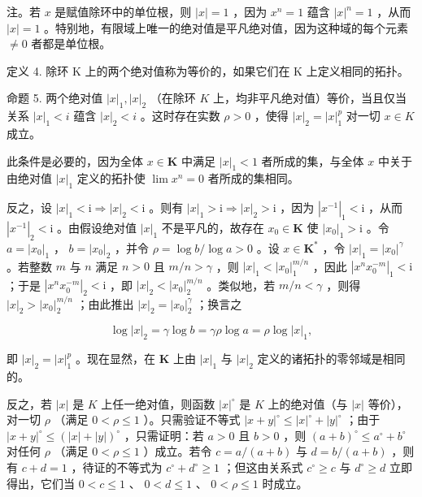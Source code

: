 注。若 \(x\) 是赋值除环中的单位根，则 \(|x| = 1\) ，因为 \(x^n = 1\) 蕴含 \(|x|^n = 1\) ，从而 \(|x| = 1\) 。特别地，有限域上唯一的绝对值是平凡绝对值，因为这种域的每个元素 \(\neq 0\) 者都是单位根。

定义 4. 除环 K 上的两个绝对值称为等价的，如果它们在 K 上定义相同的拓扑。

命题 5. 两个绝对值 \(|x|_1, |x|_2\) （在除环 \(K\) 上，均非平凡绝对值）等价，当且仅当关系 \(|x|_1 < i\) 蕴含 \(|x|_2 < i\) 。这时存在实数 \(\rho > 0\) ，使得 \(|x|_2 = |x|_1^p\) 对一切 \(x \in K\) 成立。

此条件是必要的，因为全体 \(x \in \mathbf{K}\) 中满足 \(|x|_1 < 1\) 者所成的集，与全体 \(x\) 中关于由绝对值 \(|x|_1\) 定义的拓扑使 \(\lim x^n = 0\) 者所成的集相同。

反之，设 \(|x|_1 < \mathrm{i} \Longrightarrow |x|_2 < \mathrm{i}\) 。则有 \(|x|_1 > \mathrm{i} \Longrightarrow |x|_2 > \mathrm{i}\) ，因为 \(|x^{-1}|_1 < \mathrm{i}\) ，从而 \(|x^{-1}|_2 < \mathrm{i}\) 。由假设绝对值 \(|x|_1\) 不是平凡的，故存在 \(x_0 \in \mathbf{K}\) 使 \(|x_0|_1 > \mathrm{i}\) 。令 \(a = |x_0|_1\) ， \(b = |x_0|_2\) ，并令 \(\rho = \log b / \log a > 0\) 。设 \(x \in \mathbf{K}^*\) ，令 \(|x|_1 = |x_0|^{\gamma}\) 。若整数 \(m\) 与 \(n\) 满足 \(n > 0\) 且 \(m/n > \gamma\) ，则 \(|x|_1 < |x_0|_1^{m/n}\) ，因此 \(|x^n x_0^{-m}|_1 < \mathrm{i}\) ；于是 \(|x^n x_0^{-m}|_2 < \mathrm{i}\) ，即 \(|x|_2 < |x_0|_2^{m/n}\) 。类似地，若 \(m/n < \gamma\) ，则得 \(|x|_2 > |x_0|_2^{m/n}\) ；由此推出 \(|x|_2 = |x_0|_2^\gamma\) ；换言之

\[
\log | x | _ {2} = \gamma \log b = \gamma \rho \log a = \rho \log | x | _ {1},
\]

即 \(|x|_2 = |x|_1^p\) 。现在显然，在 \(\mathbf{K}\) 上由 \(|x|_1\) 与 \(|x|_2\) 定义的诸拓扑的零邻域是相同的。

反之，若 \(|x|\) 是 \(K\) 上任一绝对值，则函数 \(|x|^{\circ}\) 是 \(K\) 上的绝对值（与 \(|x|\) 等价），对一切 \(\rho\) （满足 \(0 < \rho \leqslant 1\) ）。只需验证不等式 \(|x + y|^{\circ} \leqslant |x|^{\circ} + |y|^{\circ}\) ；由于 \(|x + y|^{\circ} \leqslant (|x| + |y|)^{\circ}\) ，只需证明：若 \(a > 0\) 且 \(b > 0\) ，则 \((a + b)^{\circ} \leqslant a^{\circ} + b^{\circ}\) 对任何 \(\rho\) （满足 \(0 < \rho \leqslant 1\) ）成立。若令 \(c = a / (a + b)\) 与 \(d = b / (a + b)\) ，则有 \(c + d = 1\) ，待证的不等式为 \(c^{\circ} + d^{\circ} \geqslant 1\) ；但这由关系式 \(c^{\circ} \geqslant c\) 与 \(d^{\circ} \geqslant d\) 立即得出，它们当 \(0 < c \leqslant 1\) 、 \(0 < d \leqslant 1\) 、 \(0 < \rho \leqslant 1\) 时成立。

